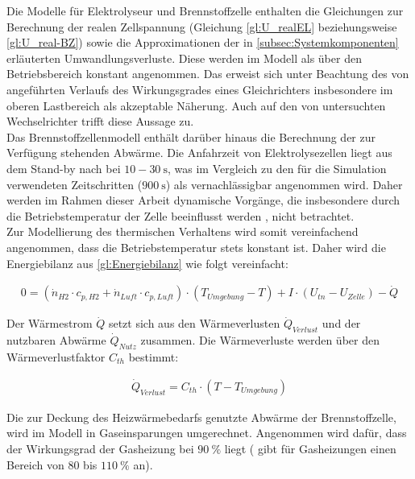 Die Modelle für Elektrolyseur und Brennstoffzelle enthalten die Gleichungen zur Berechnung der realen Zellspannung (Gleichung \ref{gl:U_realEL} beziehungsweise \ref{gl:U_real-BZ}) sowie die Approximationen der in \ref{subsec:Systemkomponenten} erläuterten Umwandlungsverluste. Diese werden im Modell als über den Betriebsbereich konstant angenommen. Das erweist sich unter Beachtung des von \citet[S.~50]{tjarks_pem-elektrolyse-systeme_2017} angeführten Verlaufs des Wirkungsgrades eines Gleichrichters insbesondere im oberen Lastbereich als akzeptable Näherung. Auch auf den von \citet{trubitsyn_high-efficiency_2010} untersuchten Wechselrichter trifft diese Aussage zu.\\

Das Brennstoffzellenmodell enthält darüber hinaus die Berechnung der zur Verfügung stehenden Abwärme. Die Anfahrzeit von Elektrolysezellen liegt aus dem Stand-by nach \citet{milanzi_technischer_2018} bei $10-\SI{30}{\s}$, was im Vergleich zu den für die Simulation verwendeten Zeitschritten ($\SI{900}{\s}$) als vernachlässigbar angenommen wird. Daher werden im Rahmen dieser Arbeit dynamische Vorgänge, die insbesondere durch die  Betriebstemperatur der Zelle beeinflusst werden \citep{garcia-valverde_simple_2012}, nicht betrachtet.\\
Zur Modellierung des thermischen Verhaltens wird somit vereinfachend angenommen, dass die Betriebstemperatur stets konstant ist. Daher wird die Energiebilanz aus \ref{gl:Energiebilanz} wie folgt vereinfacht:

\begin{align}
0 = (\dot{n}_{H2} \cdot c_{p, H2} + \dot{n}_{Luft} \cdot c_{p, Luft}) \cdot (T_{Umgebung} - T) + I \cdot (U_{tn} - U_{Zelle}) - \dot{Q}
\end{align}

Der Wärmestrom $\dot{Q}$ setzt sich aus den Wärmeverlusten $\dot{Q}_{Verlust}$ und der nutzbaren Abwärme $\dot{Q}_{Nutz}$ zusammen. Die Wärmeverluste werden über den Wärmeverlustfaktor $C_{th}$ bestimmt:

\begin{align}
\dot{Q}_{Verlust} = C_{th} \cdot (T - T_{Umgebung}) 
\end{align}

Die zur Deckung des Heizwärmebedarfs genutzte Abwärme der Brennstoffzelle, wird im Modell in Gaseinsparungen umgerechnet. Angenommen wird dafür, dass der Wirkungsgrad der Gasheizung bei $\SI{90}{\%}$ liegt (\citet{herrmann_effizienz_2006} gibt für Gasheizungen einen Bereich von $80$ bis $\SI{110}{\%}$ an).\\ 

